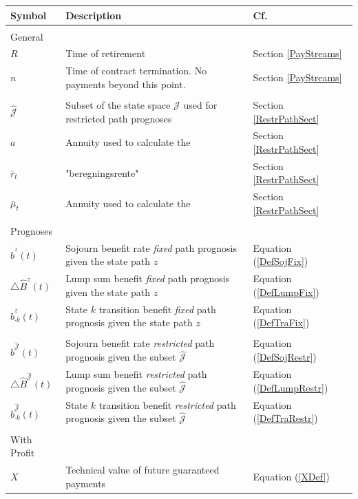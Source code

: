 \documentclass{article}
\newcommand{\1}[1]{\mathbbm{1}_{\left\lbrace #1 \right\rbrace}}
\theoremstyle{break}
\theoremstyle{remark}
\numberwithin{equation}{section}
\begin{document}
\begin{table}[H]
	\begin{tabular}{lll}
		\hline
		\textbf{Symbol}	& \textbf{Description} & \textbf{Cf.}  \\
		\hline
		&&\\
		General&&\\
		\hline
		$R$& Time of retirement & Section \ref{PayStreams}\\
		$n$& Time of contract termination. No payments beyond this point. & Section \ref{PayStreams}\\
		&&\\
		$\hat{\mathcal{J}}$	& Subset of the state space $\mathcal{J}$ used for restricted path prognoses & Section \ref{RestrPathSect} \\
		$a$	& Annuity used to calculate the  & Section \ref{RestrPathSect} \\
		$\bar{r}_t$	& "beregningsrente"  & Section \ref{RestrPathSect} \\
		$\bar{\mu}_t$	& Annuity used to calculate the  & Section \ref{RestrPathSect} \\
		&&\\
		Prognoses&&\\
		\hline
		$\hat{b}^z(t)$ & Sojourn benefit rate \textit{fixed} path prognosis given the state path $z$ & Equation (\ref{DefSojFix}) \\
		$ \triangle \hat{B}^z(t) $& Lump sum benefit \textit{fixed} path prognosis given the state path $z$ & Equation (\ref{DefLumpFix}) \\
		$ \hat{b}_{\cdot k}^z(t) $& State $k$ transition benefit \textit{fixed} path prognosis given the state path $z$ & Equation (\ref{DefTraFix}) \\
		&&\\
		$\hat{b}^{\hat{\mathcal{J}}}(t)$ & Sojourn benefit rate \textit{restricted} path prognosis given the subset $\hat{\mathcal{J}}$ & Equation (\ref{DefSojRestr}) \\
		$ \triangle \hat{B}^{\hat{\mathcal{J}}}(t) $& Lump sum benefit \textit{restricted} path prognosis given the subset $\hat{\mathcal{J}}$ & Equation (\ref{DefLumpRestr}) \\
		$ \hat{b}_{\cdot k}^{\hat{\mathcal{J}}}(t) $& State $k$ transition benefit \textit{restricted} path prognosis given the subset $\hat{\mathcal{J}}$ & Equation (\ref{DefTraRestr}) \\
		&&\\
		With Profit&&\\
		\hline
		$X$& Technical value of future guaranteed payments & Equation (\ref{XDef})\\

\end{tabular}
\end{table}
\end{document}
